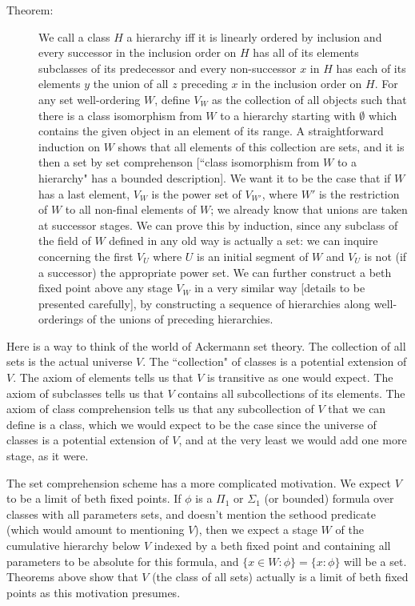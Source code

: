 \documentclass[12pt]{article}
\begin{document}
\begin{description}
\item[Theorem:]  We call a class $H$ a hierarchy iff it is linearly ordered by inclusion and  every successor in the inclusion order on $H$ has all of its elements subclasses of its predecessor and every non-successor $x$ in $H$ has each of its elements  $y$ the union of all $z$ preceding $x$ in the inclusion order on $H$.   For any set well-ordering $W$, define $V_W$ as the collection of all objects such that there is a class isomorphism from $W$ to a hierarchy starting with $\emptyset$ which contains the given object in an element of its range.  A straightforward induction on $W$ shows that all elements of this collection are sets, and it is then a set by set comprehenson [``class isomorphism from $W$ to a hierarchy" has a bounded description].  We want it to be the case that if $W$ has a last element, $V_W$ is the power set of $V_{W'}$, where $W'$ is the restriction of $W$ to all non-final elements of $W$;  we already know that unions are taken at successor stages.  We can prove this by induction, since any subclass of the field of $W$ defined in any old way is actually a set:  we can inquire concerning the first $V_U$ where $U$ is an initial segment of $W$ and $V_U$ is not (if a successor) the appropriate power set.  We can further construct a beth fixed point above any stage $V_W$ in a very similar way [details to be presented carefully], by constructing a sequence of hierarchies along well-orderings of the unions of preceding hierarchies.

\end{description}

Here is a way to think of the world of Ackermann set theory.  The collection of all sets is the actual universe $V$.  The ``collection" of classes is a potential extension of $V$.  The axiom of elements tells us that $V$ is transitive as one would expect.  The axiom of subclasses tells us that $V$ contains all subcollections of its elements.  The axiom of class comprehension tells us that any subcollection of $V$ that we can define is a class, which we would expect to be the case since the universe of classes is a potential extension of $V$, and at the very least we would add one more stage, as it were.

The set comprehension scheme has a more complicated motivation.  We expect $V$ to be a limit of beth fixed points.   If $\phi$ is a $\Pi_1$
or $\Sigma_1$ (or bounded) formula over classes with all parameters sets, and doesn't mention the sethood predicate (which would amount to mentioning $V$),
then we expect a stage $W$ of the cumulative hierarchy below $V$ indexed by a beth fixed point and containing all parameters to be absolute for this formula,
and $\{x\in W:\phi\} = \{x:\phi\}$ will be a set.  Theorems above show that $V$ (the class of all sets) actually is a limit of beth fixed points as this motivation presumes.
\end{document}
